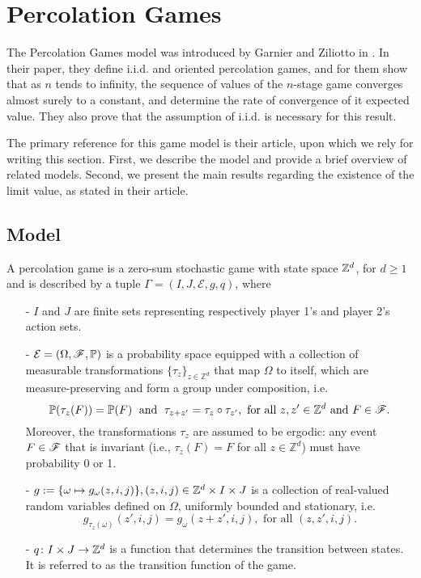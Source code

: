 \section{Percolation Games}
	The Percolation Games model was introduced by Garnier and Ziliotto in \cite{GarnierZiliotto2022}. In their paper, they define i.i.d. and oriented percolation games, and for them show that as $n$ tends to infinity, the sequence of values of the $n$-stage game converges almost surely to a constant, and determine the rate of convergence of it expected value. They also prove that the assumption of i.i.d. is necessary for this result.

	The primary reference for this game model is their article, upon which we rely for writing this section. First, we describe the model and provide a brief overview of related models. Second, we present the main results regarding the existence of the limit value, as stated in their article.

	\subsection{Model}
	A percolation game is a zero-sum stochastic game with state space $\mathbb{Z}^d$, for $d \geq 1$ and is described by a tuple $\Gamma = (I, J, \mathcal{E}, g, q)$, where 
	\begin{itemize}
		\item[-] $I$ and $J$ are finite sets representing respectively player 1’s and player 2’s action sets.
		\item[-] $\mathcal{E} = (\Omega, \mathscr{F}, \mathbb{P})$ is a probability space equipped with a collection of measurable transformations $\{\tau_z\}_{z \in \mathbb{Z}^d}$ that map $\Omega$ to itself, which are measure-preserving and form a group under composition, i.e.
		\[
			\mathbb{P}(\tau_z(F)) = \mathbb{P}(F) \; \text{ and } \; \tau_{z+z'} = \tau_z \circ \tau_{z'}, \text{ for all } z, z' \in \mathbb{Z}^d \text{ and } F \in \mathscr{F}.
		\]
		Moreover, the transformations ${\tau_z}$ are assumed to be ergodic: any event $F \in \mathscr{F}$ that is invariant (i.e., $\tau_z(F) = F$ for all $z \in \mathbb{Z}^d$) must have probability 0 or 1. 

		\item[-] $g := \{\omega \mapsto g_{\omega}(z,i,j)\}, (z,i,j) \in \mathbb{Z}^d \times I \times J$ is a collection of real-valued random variables defined on $\Omega$, uniformly bounded and stationary, i.e. 
		\[
			g_{\tau_z(\omega)}(z', i, j) = g_{\omega}(z + z', i, j), \text{ for all } (z, z', i, j).
		\]
		\item[-] $q \colon I \times J \to \mathbb{Z}^d$ is a function that determines the transition between states. It is referred to as the transition function of the game.
	\end{itemize}

